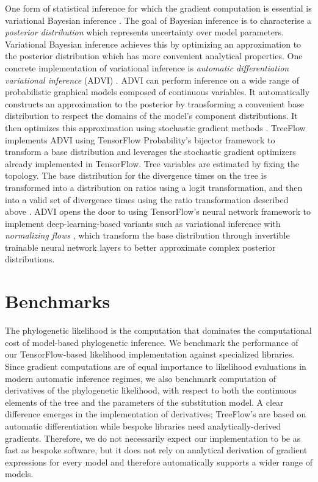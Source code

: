 One form of statistical inference for which the gradient computation is essential is variational Bayesian inference \cite{jordan1999introduction}. The goal of Bayesian inference is to characterise a \textit{posterior distribution} which represents uncertainty over model parameters. Variational Bayesian inference achieves this by optimizing an approximation to the posterior distribution which has more convenient analytical properties. One concrete implementation of variational inference is \textit{automatic differentiation variational inference} (ADVI) \cite{kucukelbir2017automatic}. ADVI can perform inference on a wide range of probabilistic graphical models composed of continuous variables. It automatically constructs an approximation to the posterior by transforming a convenient base distribution to respect the domains of the model's component distributions. It then optimizes this approximation using stochastic gradient methods \cite{robbins1951stochastic, bottou2010large}. TreeFlow implements ADVI using TensorFlow Probability's bijector framework to transform a base distribution and leverages the stochastic gradient optimizers already implemented in TensorFlow. Tree variables are estimated by fixing the topology. The base distribution for the divergence times on the tree is transformed into a distribution on ratios using a logit transformation, and then into a valid set of divergence times using the ratio transformation described above \cite{yang2007paml}. ADVI opens the door to using TensorFlow's neural network framework to implement deep-learning-based variants such as variational inference with \textit{normalizing flows} \cite{rezende2015variational}, which transform the base distribution through invertible trainable neural network layers to better approximate complex posterior distributions.

\section{Benchmarks}

The phylogenetic likelihood is the computation that dominates the computational cost of model-based phylogenetic inference. We benchmark the performance of our TensorFlow-based likelihood implementation against specialized libraries. Since gradient computations are of equal importance to likelihood evaluations in modern automatic inference regimes, we also benchmark computation of derivatives of the phylogenetic likelihood, with respect to both the continuous elements of the tree and the parameters of the substitution model. A clear difference emerges in the implementation of derivatives; TreeFlow's are based on automatic differentiation while bespoke libraries need analytically-derived gradients. Therefore, we do not necessarily expect our implementation to be as fast as bespoke software, but it does not rely on analytical derivation of gradient expressions for every model and therefore automatically supports a wider range of models.

